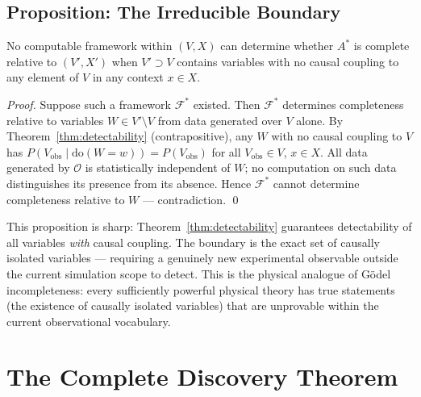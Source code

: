 \documentclass[twoside,11pt]{article}
\newcommand{\OA}{\mathcal{O}}
\newcommand{\doOp}{\mathrm{do}}
\begin{document}
\subsection{Proposition: The Irreducible Boundary}

\begin{proposition}
\label{prop:boundary}
No computable framework within $(V, X)$ can determine whether $A^*$
is complete relative to $(V', X')$ when $V' \supset V$ contains
variables with no causal coupling to any element of $V$ in any
context $x \in X$.
\end{proposition}

\begin{proof}
Suppose such a framework $\mathcal{F}^*$ existed. Then $\mathcal{F}^*$
determines completeness relative to variables $W \in V' \setminus V$
from data generated over $V$ alone. By
Theorem~\ref{thm:detectability} (contrapositive), any $W$ with no
causal coupling to $V$ has $P(V_{\mathrm{obs}} \mid \doOp(W{=}w)) =
P(V_{\mathrm{obs}})$ for all $V_{\mathrm{obs}} \in V$, $x \in X$.
All data generated by $\OA$ is statistically independent of $W$; no
computation on such data distinguishes its presence from its absence.
Hence $\mathcal{F}^*$ cannot determine completeness relative to $W$
--- contradiction. \qed
\end{proof}

\begin{remark}
This proposition is sharp: Theorem~\ref{thm:detectability} guarantees
detectability of all variables \emph{with} causal coupling.
The boundary is the exact set of causally isolated variables ---
requiring a genuinely new experimental observable outside the current
simulation scope to detect. This is the physical analogue of
Gödel incompleteness: every sufficiently powerful physical theory
has true statements (the existence of causally isolated variables)
that are unprovable within the current observational vocabulary.
\end{remark}

\section{The Complete Discovery Theorem}
\end{document}
